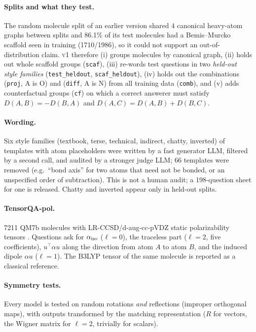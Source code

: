 \documentclass[10pt]{article}
\begin{document}
\paragraph{Splits and what they test.} The random molecule split of an earlier version shared 4 canonical heavy-atom graphs between
splits and 86.1\% of its test molecules had a Bemis--Murcko scaffold seen in training (1710/1986), so it could not support an
out-of-distribution claim. \textsc{v1} therefore (i) groups molecules by canonical graph, (ii) holds out whole scaffold groups
(\texttt{scaf}), (iii) re-words test questions in two \emph{held-out style families} (\texttt{test\_heldout}, \texttt{scaf\_heldout}),
(iv) holds out the combinations (\texttt{proj}, A is O) and (\texttt{diff}, A is N) from all training data (\texttt{comb}), and
(v) adds counterfactual groups (\texttt{cf}) on which a correct answerer must satisfy $D(A,B)=-D(B,A)$ and $D(A,C)=D(A,B)+D(B,C)$.
\paragraph{Wording.} Six style families (textbook, terse, technical, indirect, chatty, inverted) of templates with atom
placeholders were written by a fast generator LLM, filtered by a second call, and audited by a stronger judge LLM;
66 templates were removed (e.g.\ ``bond axis'' for two atoms that need not be bonded, or an unspecified order of subtraction).
This is not a human audit; a 198-question sheet for one is released. Chatty and inverted appear only in held-out splits.
\paragraph{TensorQA-pol.} 7211 QM7b molecules with LR-CCSD/d-aug-cc-pVDZ static polarizability tensors \citep{qm7bpol}. Questions ask for
$\alpha_{\rm iso}$ ($\ell=0$), the traceless part ($\ell=2$, five coefficients), $u^\top\alpha u$ along the direction from atom $A$ to atom $B$,
and the induced dipole $\alpha u$ ($\ell=1$). The B3LYP tensor of the same molecule is reported as a classical reference.
\paragraph{Symmetry tests.} Every model is tested on random rotations \emph{and} reflections (improper orthogonal maps), with outputs
transformed by the matching representation ($R$ for vectors, the Wigner matrix for $\ell=2$, trivially for scalars).
\end{document}

